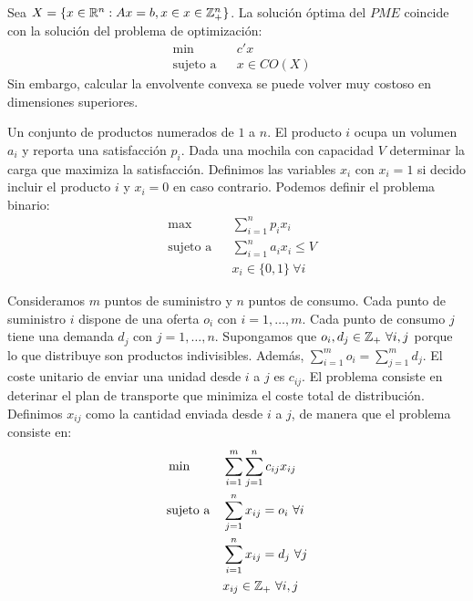 \documentclass[PM.tex]{subfiles}
\begin{document}
\begin{obser}
Sea $X=\{x \in \mathbb{R}^n : Ax=b, x \in x \in \mathbb{Z}_+^n\}$. La solución óptima del $PME$ coincide con la solución del problema de optimización:
\[
\begin{aligned}
& \min
& & c'x \\
& \text{sujeto a}
& & x \in CO(X)\end{aligned}
\]
Sin embargo, calcular la envolvente convexa se puede volver muy costoso en dimensiones superiores.
\end{obser}
\newpage
\begin{example}
Un conjunto de productos numerados de $1$ a $n$. El producto $i$ ocupa un volumen $a_i$ y reporta una satisfacción $p_i$. Dada una mochila con capacidad $V$ determinar la carga que maximiza la satisfacción. Definimos las variables $x_i$ con $x_i = 1$ si decido incluir el producto $i$ y $x_i = 0$ en caso contrario. Podemos definir el problema binario:
\[
\begin{aligned}
& \max
& & \sum_{i=1}^n p_i x_i \\
& \text{sujeto a}
& & \sum_{i=1}^n a_i x_i ≤ V\\
& & & x_i \in \{0,1\}\ \forall i 
\end{aligned}
\]
\end{example}

\begin{example}
Consideramos $m$ puntos de suministro y $n$ puntos de consumo. Cada punto de suministro $i$ dispone de una oferta $o_i$ con $i = 1,\dots,m$. Cada punto de consumo $j$ tiene una demanda $d_j$ con $j = 1,\dots,n$. Supongamos que $o_i,d_j \in \mathbb{Z}_+\ \forall i,j$ porque lo que distribuye son productos indivisibles. Además, $\sum_{i=1}^m o_i = \sum_{j=1}^m d_j$. El coste unitario de enviar una unidad desde $i$ a $j$ es $c_{ij}$. El problema consiste en deterinar el plan de transporte que minimiza el coste total de distribución. Definimos $x_{ij}$ como la cantidad enviada desde $i$ a $j$, de manera que el problema consiste en:
\[
\begin{aligned}
& \min
& & \sum_{i=1}^m \sum_{j=1}^n c_{ij}x_{ij} \\
& \text{sujeto a}
& & \sum_{j=1}^n x_{ij} = o_i \ \forall i\\
& & & \sum_{i=1}^n x_{ij} = d_j \ \forall j\\
& & & x_{ij} \in \mathbb{Z}_+ \ \forall i,j
\end{aligned}
\]
\end{example}
\end{document}
